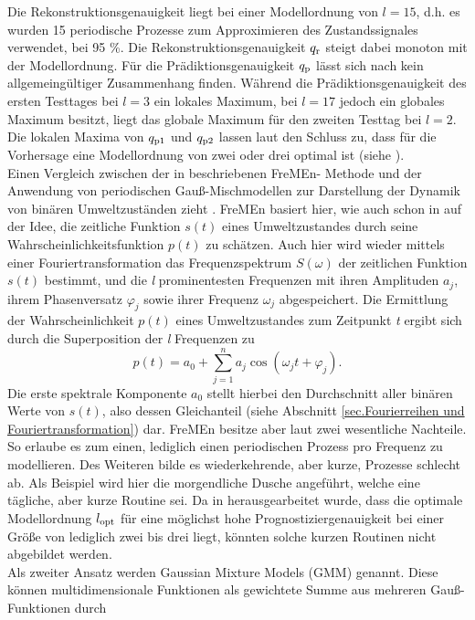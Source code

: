 Die Rekonstruktionsgenauigkeit liegt bei einer Modellordnung von $l=15$, d.h. es wurden 15 periodische Prozesse zum Approximieren des Zustandssignales verwendet, bei 95 \%. Die Rekonstruktionsgenauigkeit $q_{\mathrm{r}}$ steigt dabei monoton mit der Modellordnung. Für die Prädiktionsgenauigkeit $q_{\mathrm{p}}$ lässt sich nach \cite{Krajnik.2014} kein allgemeingültiger Zusammenhang finden. Während die Prädiktionsgenauigkeit des ersten Testtages bei $l=3$ ein lokales Maximum, bei $l=17$ jedoch ein globales Maximum besitzt, liegt das globale Maximum für den zweiten Testtag bei $l=2$.\\
Die lokalen Maxima von $q_{\mathrm{p1}}$ und $q_{\mathrm{p2}}$ lassen laut \cite{Krajnik.2014} den Schluss zu, dass für die Vorhersage eine Modellordnung von zwei oder drei optimal ist (siehe ). \\
Einen Vergleich zwischen der in \cite{Krajnik.2014} beschriebenen FreMEn- Methode und der Anwendung von periodischen Gauß-Mischmodellen zur Darstellung der Dynamik von binären Umweltzuständen zieht \cite{Krajnik.2015b}. FreMEn basiert hier, wie auch schon in \cite{Krajnik.2014} auf der Idee, die zeitliche Funktion $s(t)$ eines Umweltzustandes durch seine Wahrscheinlichkeitsfunktion $p(t)$ zu schätzen. Auch hier wird wieder mittels einer Fouriertransformation das Frequenzspektrum $S(\omega)$ der zeitlichen Funktion $s(t)$ bestimmt, und die \textit{l} prominentesten Frequenzen mit ihren Amplituden $a_j$, ihrem Phasenversatz $\varphi_j$ sowie ihrer Frequenz $\omega_j$ abgespeichert. Die Ermittlung der Wahrscheinlichkeit $p(t)$ eines Umweltzustandes zum Zeitpunkt \textit{t} ergibt sich durch die Superposition der \emph{l} Frequenzen zu
\begin{equation}
	p(t) = a_0 + \sum_{j=1}^{n} a_j \cos(\omega_j t + \varphi_j) .
	\label{eq:Superposition}
\end{equation}
Die erste spektrale Komponente $a_0$ stellt hierbei den Durchschnitt aller binären Werte von $s(t)$, also dessen Gleichanteil (siehe Abschnitt \ref{sec.Fourierreihen und Fouriertransformation}) dar. FreMEn besitze aber laut \cite{Krajnik.2015b} zwei wesentliche Nachteile. So erlaube es zum einen, lediglich einen periodischen Prozess pro Frequenz zu modellieren. Des Weiteren bilde es wiederkehrende, aber kurze, Prozesse schlecht ab. Als Beispiel wird hier die morgendliche Dusche angeführt, welche eine tägliche, aber kurze Routine sei. Da in \cite{Krajnik.2014} herausgearbeitet wurde, dass die optimale Modellordnung $l_{\mathrm{opt}}$ für eine möglichst hohe Prognostiziergenauigkeit bei einer Größe von lediglich zwei bis drei liegt, könnten solche kurzen Routinen nicht abgebildet werden. \\ Als zweiter Ansatz werden Gaussian Mixture Models (GMM) genannt. Diese können multidimensionale Funktionen als gewichtete Summe aus mehreren Gauß-Funktionen durch
